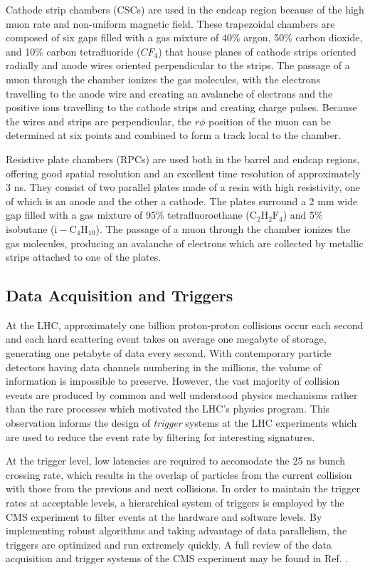 Cathode strip chambers (CSCs) are used in the endcap region because of the high muon rate and non-uniform magnetic field. These trapezoidal chambers are composed of six gaps filled with a gas mixture of 40\% argon, 50\% carbon dioxide, and 10\% carbon tetrafluoride ($CF_{4}$) that house planes of cathode strips oriented radially and anode wires oriented perpendicular to the strips. The passage of a muon through the chamber ionizes the gas molecules, with the electrons travelling to the anode wire and creating an avalanche of electrons and the positive ions travelling to the cathode strips and creating charge pulses. Because the wires and strips are perpendicular, the $r\phi$ position of the muon can be determined at six points and combined to form a track local to the chamber.

Resistive plate chambers (RPCs) are used both in the barrel and endcap regions, offering good spatial resolution and an excellent time resolution of approximately 3 ns. They consist of two parallel plates made of a resin with high resistivity, one of which is an anode and the other a cathode. The plates surround a 2 mm wide gap filled with a gas mixture of 95\% tetrafluoroethane ($\mathrm{C_{2}H_{2}F_{4}}$) and 5\% isobutane ($\mathrm{i-C_{4}H_{10}}$). The passage of a muon through the chamber ionizes the gas molecules, producing an avalanche of electrons which are collected by metallic strips attached to one of the plates.

\subsection{Data Acquisition and Triggers}

At the LHC, approximately one billion proton-proton collisions occur each second and each hard scattering event takes on average one megabyte of storage, generating one petabyte of data every second. With contemporary particle detectors having data channels numbering in the millions, the volume of information is impossible to preserve. However, the vast majority of collision events are produced by common and well understood physics mechanisms rather than the rare processes which motivated the LHC's physics program. This observation informs the design of \textit{trigger} systems at the LHC experiments which are used to reduce the event rate by filtering for interesting signatures.

At the trigger level, low latencies are required to accomodate the 25 ns bunch crossing rate, which results in the overlap of particles from the current collision with those from the previous and next collisions. In order to maintain the trigger rates at acceptable levels, a hierarchical system of triggers is employed by the CMS experiment to filter events at the hardware and software levels. By implementing robust algorithms and taking advantage of data parallelism, the triggers are optimized and run extremely quickly. A full review of the data acquisition and trigger systems of the CMS experiment may be found in Ref. \cite{CMSTRIDAS}.

